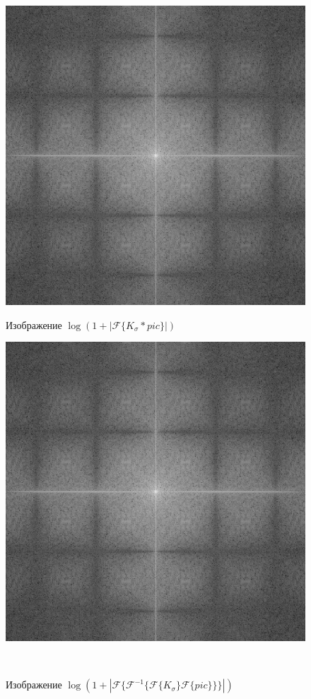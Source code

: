 \documentclass[a4paper]{article}
\begin{document}
\begin{figure}[H]
    \begin{minipage}{0.49\textwidth}
        \centering \includegraphics[width=\textwidth]{2/3_abs_fourier_log_norm_img_gaussian.png}
        \caption{Изображение $\log{(1+|\mathcal{F}\{K_\sigma*pic\}|)}$}
    \end{minipage}\hfill
    \begin{minipage}{0.49\textwidth}
        \centering \includegraphics[width=\textwidth]{2/3_abs_fourier_log_norm_img_gaussian1.png}
        \caption{Изображение $\log{(1+|\mathcal{F}\{\mathcal{F}^{-1}\{ \mathcal{F}\{K_\sigma\}\mathcal{F}\{pic\}\}\}|)}$}
    \end{minipage}\\[1em]
\end{figure}\noindent\
\end{document}
